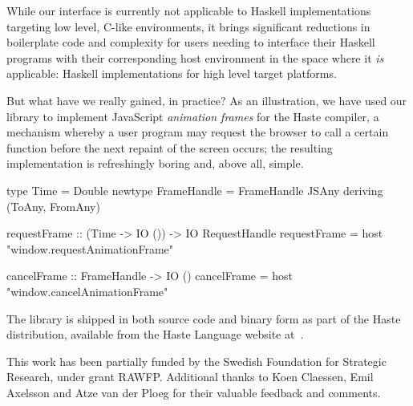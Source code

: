 \documentclass{sigplanconf}
\begin{document}
While our interface is currently not applicable to Haskell implementations
targeting low level, C-like environments, it brings significant reductions in
boilerplate code and complexity for users needing to interface their Haskell
programs with their corresponding host environment in the space where it
\emph{is} applicable: Haskell implementations for high level target platforms.

But what have we really gained, in practice?
As an illustration, we have used our library to implement JavaScript
\emph{animation frames} for the Haste compiler,
a mechanism whereby a user program may request the browser to call a certain
function before the next repaint of the screen occurs;
the resulting implementation is refreshingly boring and, above all, simple.

\begin{code}
  type Time = Double
  newtype FrameHandle = FrameHandle JSAny
    deriving (ToAny, FromAny)

  requestFrame :: (Time -> IO ()) -> IO RequestHandle
  requestFrame = host "window.requestAnimationFrame"

  cancelFrame :: FrameHandle -> IO ()
  cancelFrame = host "window.cancelAnimationFrame"
\end{code}

The library is shipped in both source code and binary form as part of the
Haste distribution, available from the Haste Language website
at\ \cite{haste-lang.org}.

\acks
This work has been partially funded by the Swedish Foundation for Strategic Research, under grant RAWFP. Additional thanks to Koen Claessen, Emil Axelsson and Atze van der Ploeg for their valuable feedback and comments.




\end{document}
